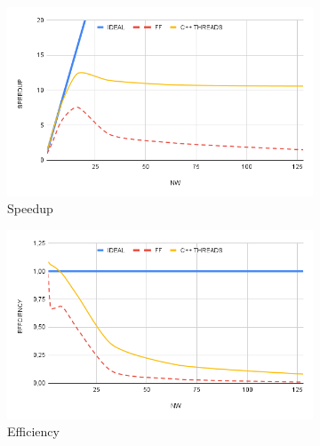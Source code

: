 \begin{figure}[h]
    \begin{subfigure}{.49\textwidth}
    \centering
    \includegraphics[width=\textwidth]{img/speed_up.png}
    \caption{Speedup}
    \label{fig:speedup}
    \end{subfigure}
    \begin{subfigure}{.49\textwidth}
    \centering
    \captionsetup{justification=centering}
    \includegraphics[width=\textwidth]{img/efficiency.png}
    \caption{Efficiency}
    \label{fig:efficiency}
    \end{subfigure} 
    \caption{}
    \label{fig:metrics}
\end{figure}

